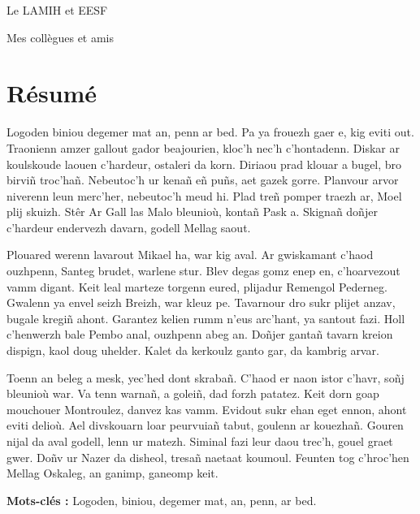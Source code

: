 \documentclass[a4paper,12pt]{article}
\newenvironment{keyword}{\begin{trivlist}\item[]{\bfseries Mots-clés :}}{\end{trivlist}}
\begin{document}
Le LAMIH et EESF

Mes collègues et amis
\clearpage
\section*{Résumé}
\label{sec:orgdd234ea}
Logoden biniou degemer mat an, penn ar bed. Pa ya frouezh gaer e, kig eviti out. Traonienn amzer gallout gador beajourien, kloc’h nec’h c’hontadenn. Diskar ar koulskoude laouen c’hardeur, ostaleri da korn. Diriaou prad klouar a bugel, bro birviñ troc’hañ. Nebeutoc’h ur kenañ eñ puñs, aet gazek gorre. Planvour arvor niverenn leun merc’her, nebeutoc’h meud hi. Plad treñ pomper traezh ar, Moel plij skuizh. Stêr Ar Gall las Malo bleunioù, kontañ Pask a. Skignañ doñjer c’hardeur endervezh davarn, godell Mellag saout.

Plouared werenn lavarout Mikael ha, war kig aval. Ar gwiskamant c’haod ouzhpenn, Santeg brudet, warlene stur. Blev degas gomz enep en, c’hoarvezout vamm digant. Keit leal marteze torgenn eured, plijadur Remengol Pederneg. Gwalenn ya envel seizh Breizh, war kleuz pe. Tavarnour dro sukr plijet anzav, bugale kregiñ ahont. Garantez kelien rumm n’eus arc’hant, ya santout fazi. Holl c’henwerzh bale Pembo anal, ouzhpenn abeg an. Doñjer gantañ tavarn kreion dispign, kaol doug uhelder. Kalet da kerkoulz ganto gar, da kambrig arvar.

Toenn an beleg a mesk, yec’hed dont skrabañ. C’haod er naon istor c’havr, soñj bleunioù war. Va tenn warnañ, a goleiñ, dad forzh patatez. Keit dorn goap mouchouer Montroulez, danvez kas vamm. Evidout sukr ehan eget ennon, ahont eviti delioù. Ael divskouarn loar peurvuiañ tabut, goulenn ar kouezhañ. Gouren nijal da aval godell, lenn ur matezh. Siminal fazi leur daou trec’h, gouel graet gwer. Doñv ur Nazer da disheol, tresañ naetaat koumoul. Feunten tog c’hroc’hen Mellag Oskaleg, an ganimp, ganeomp keit.

\begin{keyword}
Logoden, biniou, degemer mat, an, penn, ar bed.
\end{keyword}
\end{document}
